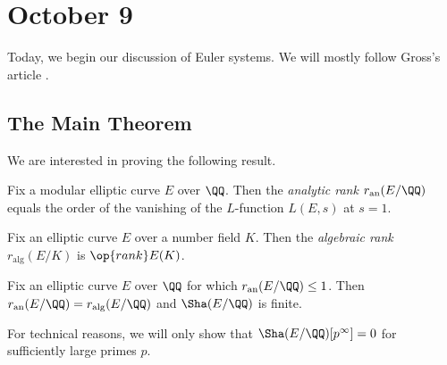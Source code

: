 \documentclass[../notes.tex]{subfiles}
\begin{document}
\section{October 9}
Today, we begin our discussion of Euler systems. We will mostly follow Gross's article \cite{gross-kolyvagin-system}.

\subsection{The Main Theorem}
We are interested in proving the following result.
\begin{definition}
	Fix a modular elliptic curve $E$ over $\QQ$. Then the \textit{analytic rank} $r_{\mathrm{an}}(E/\QQ)$ equals the order of the vanishing of the $L$-function $L(E,s)$ at $s=1$.
\end{definition}
\begin{definition}
	Fix an elliptic curve $E$ over a number field $K$. Then the \textit{algebraic rank} $r_{\mathrm{alg}}(E/K)$ is $\op{rank}E(K)$.
\end{definition}
\begin{theorem} \label{thm:gzk-over-q}
	Fix an elliptic curve $E$ over $\QQ$ for which $r_{\mathrm{an}}(E/\QQ)\le1$. Then $r_{\mathrm{an}}(E/\QQ)=r_{\mathrm{alg}}(E/\QQ)$ and $\Sha(E/\QQ)$ is finite.
\end{theorem}
\begin{remark}
	For technical reasons, we will only show that $\Sha(E/\QQ)[p^\infty]=0$ for sufficiently large primes $p$.
\end{remark}
\end{document}
